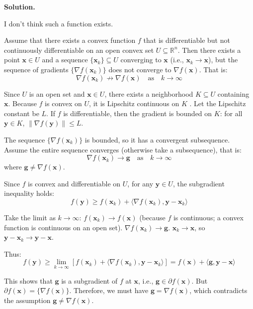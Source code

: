 \documentclass[12pt, a4paper, oneside]{ctexart}
\newenvironment{solution}{\par\noindent\textbf{Solution. }}{\par}
\begin{document}
\begin{solution}
 
I don't think such a function exists.

Assume that there exists a convex function $ f $ that is differentiable but not continuously differentiable on an open convex set $ U \subseteq \mathbb{R}^n $. Then there exists a point $ \mathbf{x} \in U $ and a sequence $ \{\mathbf{x}_k\} \subseteq U $ converging to $ \mathbf{x} $ (i.e., $ \mathbf{x}_k \to \mathbf{x} $), but the sequence of gradients $ \{\nabla f(\mathbf{x}_k)\} $ does not converge to $ \nabla f(\mathbf{x}) $. That is:
$$
\nabla f(\mathbf{x}_k) \nrightarrow \nabla f(\mathbf{x}) \quad \text{as} \quad k \to \infty
$$

Since $ U $ is an open set and $ \mathbf{x} \in U $, there exists a neighborhood $ K \subseteq U $ containing $ \mathbf{x} $. Because $ f $ is convex on $ U $, it is Lipschitz continuous on $ K $ . Let the Lipschitz constant be $ L $. If $ f $ is differentiable, then the gradient is bounded on $ K $: for all $ \mathbf{y} \in K $, $ \|\nabla f(\mathbf{y})\| \leq L $.

The sequence $ \{\nabla f(\mathbf{x}_k)\} $ is bounded, so it has a convergent subsequence. Assume the entire sequence converges (otherwise take a subsequence), that is:
$$
\nabla f(\mathbf{x}_k) \to \mathbf{g} \quad \text{as} \quad k \to \infty
$$
where $ \mathbf{g} \neq \nabla f(\mathbf{x}) $.

Since $ f $ is convex and differentiable on $ U $, for any $ \mathbf{y} \in U $, the subgradient inequality holds:
$$
f(\mathbf{y}) \geq f(\mathbf{x}_k) + \langle \nabla f(\mathbf{x}_k), \mathbf{y} - \mathbf{x}_k \rangle
$$

Take the limit as $ k \to \infty $:
$ f(\mathbf{x}_k) \to f(\mathbf{x}) $ (because $ f $ is continuous; a convex function is continuous on an open set).
$ \nabla f(\mathbf{x}_k) \to \mathbf{g} $.
$ \mathbf{x}_k \to \mathbf{x} $, so $ \mathbf{y} - \mathbf{x}_k \to \mathbf{y} - \mathbf{x}$.

Thus:
$$
f(\mathbf{y}) \geq \lim_{k \to \infty} \left[ f(\mathbf{x}_k) + \langle \nabla f(\mathbf{x}_k), \mathbf{y} - \mathbf{x}_k \rangle \right] = f(\mathbf{x}) + \langle \mathbf{g}, \mathbf{y} - \mathbf{x} \rangle
$$

This shows that $ \mathbf{g} $ is a subgradient of $ f $ at $ \mathbf{x} $, i.e., $ \mathbf{g} \in \partial f(\mathbf{x}) $. But  $ \partial f(\mathbf{x}) = \{\nabla f(\mathbf{x})\} $. Therefore, we must have $ \mathbf{g} = \nabla f(\mathbf{x}) $, which contradicts the assumption $ \mathbf{g} \neq \nabla f(\mathbf{x}) $.
 
\end{solution}
\end{document}
